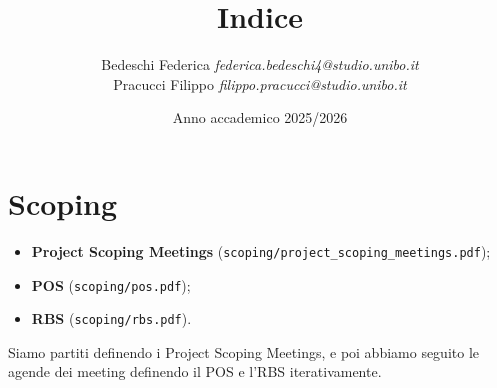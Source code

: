 \documentclass[a4paper,12pt]{article}
\title{\textbf{Indice}}
\author{
    Bedeschi Federica \textit{federica.bedeschi4@studio.unibo.it} \\
    Pracucci Filippo \textit{filippo.pracucci@studio.unibo.it}
}
\date{Anno accademico 2025/2026}
\begin{document}
\maketitle

\section{Scoping}
\begin{itemize}
    \item \textbf{Project Scoping Meetings} (\texttt{scoping/project\_scoping\_meetings.pdf});
    \item \textbf{POS} (\texttt{scoping/pos.pdf});
    \item \textbf{RBS} (\texttt{scoping/rbs.pdf}).
\end{itemize}
Siamo partiti definendo i Project Scoping Meetings, e poi abbiamo seguito le agende dei meeting definendo il POS e
l'RBS iterativamente.
\end{document}
